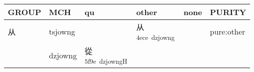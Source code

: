 \documentclass[14pt,a4paper]{scrartcl}
\begin{document}
\begin{longtable}[c]{@{}llllll@{}}
\toprule
\begin{minipage}[b]{0.14\columnwidth}\raggedright\strut
GROUP
\strut\end{minipage} &
\begin{minipage}[b]{0.14\columnwidth}\raggedright\strut
MCH
\strut\end{minipage} &
\begin{minipage}[b]{0.14\columnwidth}\raggedright\strut
qu
\strut\end{minipage} &
\begin{minipage}[b]{0.14\columnwidth}\raggedright\strut
other
\strut\end{minipage} &
\begin{minipage}[b]{0.14\columnwidth}\raggedright\strut
none
\strut\end{minipage} &
\begin{minipage}[b]{0.14\columnwidth}\raggedright\strut
PURITY
\strut\end{minipage}\tabularnewline
\midrule
\endhead
\begin{minipage}[t]{0.14\columnwidth}\raggedright\strut
从
\strut\end{minipage} &
\begin{minipage}[t]{0.14\columnwidth}\raggedright\strut
tsjowng
\strut\end{minipage} &
\begin{minipage}[t]{0.14\columnwidth}\raggedright\strut
\strut\end{minipage} &
\begin{minipage}[t]{0.14\columnwidth}\raggedright\strut
从\textsuperscript{4ece~dzjowng}
\strut\end{minipage} &
\begin{minipage}[t]{0.14\columnwidth}\raggedright\strut
\strut\end{minipage} &
\begin{minipage}[t]{0.14\columnwidth}\raggedright\strut
pure:other
\strut\end{minipage}\tabularnewline
\begin{minipage}[t]{0.14\columnwidth}\raggedright\strut
𨑢
\strut\end{minipage} &
\begin{minipage}[t]{0.14\columnwidth}\raggedright\strut
dzjowng
\strut\end{minipage} &
\begin{minipage}[t]{0.14\columnwidth}\raggedright\strut
從\textsuperscript{5f9e~dzjowngH}
\strut\end{minipage} &

\end{longtable}
\end{document}
